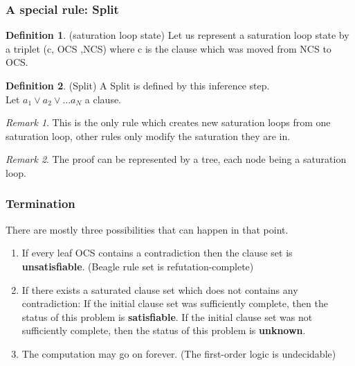 \documentclass[a4paper, 11pt]{article}
\theoremstyle{plain}
\theoremstyle{definition}
\newtheorem*{mydef}{Definition}
\theoremstyle{remark}
\newtheorem*{remark}{Remark}
\begin{document}
\subsubsection{A special rule: Split}

\begin{mydef} (saturation loop state)
Let us represent a saturation loop state by a triplet (c, OCS ,NCS) where c is the clause which was moved from NCS to OCS. 
\end{mydef} 
 
\begin{mydef} (Split)
A Split is defined by this inference step. 
\\Let $a_1 \vee a_2 \vee \ldots a_N$ a clause.

\begin{prooftree}
\end{prooftree}  
   
\end{mydef}

\begin{remark} This is the only rule which creates new saturation loops from one saturation loop, other rules only modify the saturation they are in.
\end{remark}
\begin{remark} The proof can be represented by a tree, each node being a saturation loop.
\end{remark}
  
\subsubsection{Termination}

There are mostly three possibilities that can happen in that point.
\begin{enumerate}
\item If every leaf OCS contains a contradiction then the clause set is \textbf{unsatisfiable}. (Beagle rule set is refutation-complete)
\item If there exists a saturated clause set which does not contains any contradiction:
\subitem If the initial clause set was sufficiently complete, then the status of this problem is \textbf{satisfiable}.
\subitem If the initial clause set was not sufficiently complete, then the status of this problem is \textbf{unknown}.
\item The computation may go on forever. (The first-order logic is undecidable)
\end{enumerate} 
\end{document}
